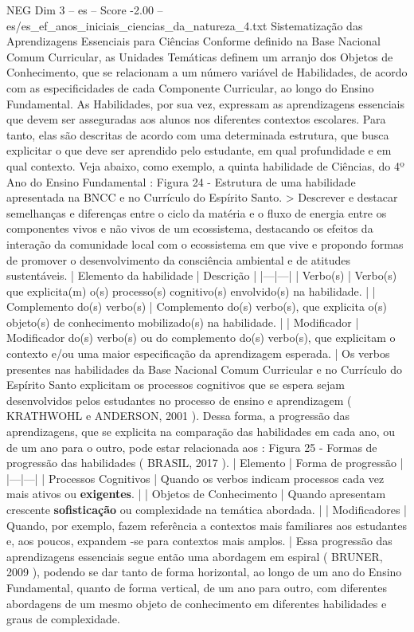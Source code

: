 \begin{textsample}{NEG Dim 3 – es – Score -2.00 – es/es\_ef\_anos\_iniciais\_ciencias\_da\_natureza\_4.txt}  \label{ex:f3_neg_173}
Sistematização das Aprendizagens Essenciais para Ciências Conforme definido na Base Nacional Comum Curricular, as Unidades Temáticas definem um arranjo dos Objetos de Conhecimento, que se relacionam a um número variável de Habilidades, de acordo com as especificidades de cada Componente Curricular, ao longo do Ensino Fundamental.
As Habilidades, por sua vez, expressam as aprendizagens essenciais que devem ser asseguradas aos alunos nos diferentes contextos escolares.
Para tanto, elas são descritas de acordo com uma determinada estrutura, que busca explicitar o que deve ser aprendido pelo estudante, em qual profundidade e em qual contexto.
Veja abaixo, como exemplo, a quinta habilidade de Ciências, do 4º Ano do Ensino Fundamental : Figura 24 - Estrutura de uma habilidade apresentada na BNCC e no Currículo do Espírito Santo. > Descrever e destacar semelhanças e diferenças entre o ciclo da matéria e o fluxo de energia entre os componentes vivos e não vivos de um ecossistema, destacando os efeitos da interação da comunidade local com o ecossistema em que vive e propondo formas de promover o desenvolvimento da consciência ambiental e de atitudes sustentáveis. | Elemento da habilidade | Descrição | |---|---| | Verbo(s) | Verbo(s) que explicita(m) o(s) processo(s) cognitivo(s) envolvido(s) na habilidade. | | Complemento do(s) verbo(s) | Complemento do(s) verbo(s), que explicita o(s) objeto(s) de conhecimento mobilizado(s) na habilidade. | | Modificador | Modificador do(s) verbo(s) ou do complemento do(s) verbo(s), que explicitam o contexto e/ou uma maior especificação da aprendizagem esperada. | Os verbos presentes nas habilidades da Base Nacional Comum Curricular e no Currículo do Espírito Santo explicitam os processos cognitivos que se espera sejam desenvolvidos pelos estudantes no processo de ensino e aprendizagem ( KRATHWOHL e ANDERSON, 2001 ).
Dessa forma, a progressão das aprendizagens, que se explicita na comparação das habilidades em cada ano, ou de um ano para o outro, pode estar relacionada aos : Figura 25 - Formas de progressão das habilidades ( BRASIL, 2017 ). | Elemento | Forma de progressão | |---|---| | Processos Cognitivos | Quando os verbos indicam processos cada vez mais ativos ou \textbf{exigentes}. | | Objetos de Conhecimento | Quando apresentam crescente \textbf{sofisticação} ou complexidade na temática abordada. | | Modificadores | Quando, por exemplo, fazem referência a contextos mais familiares aos estudantes e, aos poucos, expandem -se para contextos mais amplos. | Essa progressão das aprendizagens essenciais segue então uma abordagem em espiral ( BRUNER, 2009 ), podendo se dar tanto de forma horizontal, ao longo de um ano do Ensino Fundamental, quanto de forma vertical, de um ano para outro, com diferentes abordagens de um mesmo objeto de conhecimento em diferentes habilidades e graus de complexidade.

\end{textsample}

